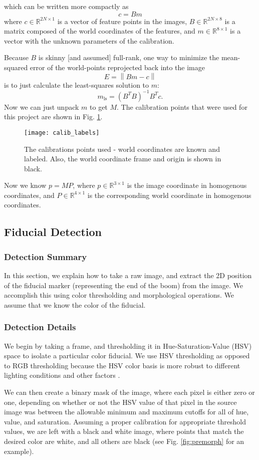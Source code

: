 \documentclass[letterpaper, 10 pt, conference]{ieeeconf}  %
\newcommand{\real}[1]{\mathbb{R}^{#1}}
\newcommand{\norm}[1]{\left\lVert #1 \right\rVert}
\begin{document}
which can be written more compactly as 
\[
c = Bm
\]
where $c \in \real{2N \times 1}$ is a vector of feature points in the images, $B \in \real{2N \times 8}$ is a matrix composed of the world coordinates of the features, and $m \in \real{8 \times 1}$ is a vector with the unknown parameters of the calibration.

Because $B$ is skinny [and assumed] full-rank, one way to minimize the mean-squared error of the world-points reprojected back into the image
\[
E = \norm{Bm - c}
\] is to just calculate the least-squares solution to $m$:
\[
m_{\text{ls}} = \left(B^TB\right)^{-1}B^Tc.
\]
Now we can just unpack $m$ to get $M$. The calibration points that were used for this project are  shown in Fig. \ref{fig:calib_labels}.
\begin{figure}[htbp]
   \centering
   \texttt{[image: calib\_labels]}
   \caption{The calibrations points used - world coordinates are known and labeled. Also, the world coordinate frame and origin is shown in black.}
   \label{fig:calib_labels}
\end{figure}

Now we know $p = MP$, where $p \in \real{3\times 1}$ is the image coordinate in homogenous coordinates, and $P \in \real{4 \times 1}$ is the corresponding world coordinate in homogenous coordinates. 
\subsection{Fiducial Detection}
\label{sec:fid}
\subsubsection{Detection Summary}
In this section, we explain how to take a raw image, and extract the 2D position of the fiducial marker (representing the end of the boom) from the image. We accomplish this using color thresholding and morphological operations. We assume that we know the color of the fiducial. 
\subsubsection{Detection Details}
We begin by taking a frame, and thresholding it in Hue-Saturation-Value (HSV) space to isolate a particular color fiducial. We use HSV thresholding as opposed to RGB thresholding because the HSV color basis is more robust to different lighting conditions and other factors \cite{hounslow:13}. 

We can then create a binary mask of the image, where each pixel is either zero or one, depending on whether or not the HSV value of that pixel in the source image was between the allowable minimum and maximum cutoffs for all of hue, value, and saturation. 
Assuming a proper calibration for appropriate threshold values, we are left with a black and white image, where points that match the desired color are white, and all others are black (see Fig. \ref{fig:premorph} for an example). 
\end{document}
